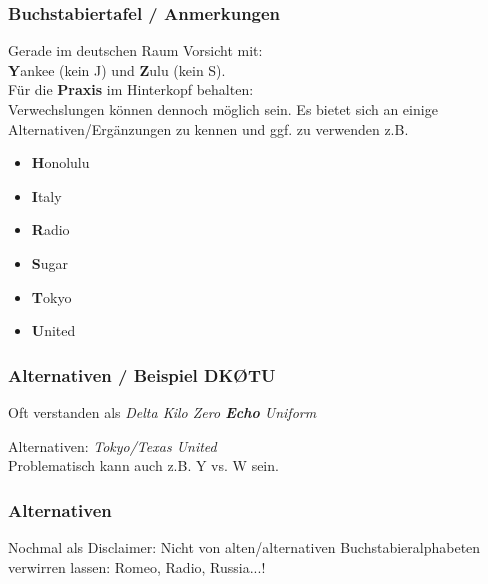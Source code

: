 \begin{frame}
    \frametitle{Buchstabiertafel / Anmerkungen}

    Gerade im deutschen Raum Vorsicht mit: \\
    \textbf{Y}ankee (kein J) und \textbf{Z}ulu (kein S). \\[2em]

    Für die \textbf{Praxis} im Hinterkopf behalten: \\
    Verwechslungen können dennoch möglich sein. Es bietet sich an einige
    Alternativen/Ergänzungen zu kennen und ggf. zu verwenden z.B.
    
    \begin{itemize}
        \item \textbf{H}onolulu  
        \item \textbf{I}taly     
        \item \textbf{R}adio
        \item \textbf{S}ugar     
        \item \textbf{T}okyo
        \item \textbf{U}nited
    \end{itemize}

\end{frame}

\begin{frame}
    \frametitle{Alternativen / Beispiel DKØTU}
   

    \pause

    Oft verstanden als \emph{Delta Kilo Zero \textbf{Echo} Uniform} \\[2em]

    \pause

    Alternativen: \emph{Tokyo/Texas United}
    \\[2em]
    Problematisch kann auch z.B. Y vs. W sein.

\end{frame}

\begin{frame}
    \frametitle{Alternativen}

    \begin{exampleblock}{Nochmal als Disclaimer:}
        Nicht von alten/alternativen Buchstabieralphabeten verwirren lassen:
        Romeo, Radio, Russia...!
    \end{exampleblock}

\end{frame}

